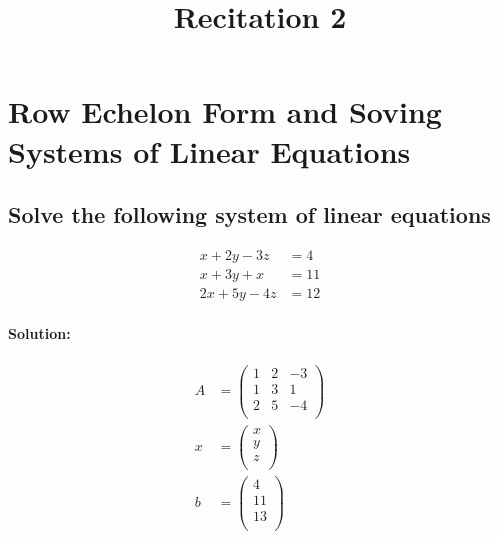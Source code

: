 \documentclass[fleqn]{article}
\title{Recitation 2}
\author{}
\date{\formatdate{5}{11}{2014}}
\begin{document}
\maketitle
\setlength{\mathindent}{0pt}

\tableofcontents

\newpage
\section{Row Echelon Form and Soving Systems of Linear Equations}

\subsection{Solve the following system of linear equations}

\begin{align*}
	x + 2y - 3z &= 4\\
	x + 3y + x &= 11\\
	2x + 5y - 4z &= 12
\end{align*}

\paragraph*{Solution:\\}

\begin{align*}
	A &= 
	\begin{pmatrix}
		1 & 2 & -3 \\
		1 & 3 & 1 \\
		2 & 5 & -4 \\
	\end{pmatrix}\\
	x &= 
	\begin{pmatrix}
		x\\
		y\\
		z\\
	\end{pmatrix}\\
	b &= 
	\begin{pmatrix}
		4\\
		11\\
		13\\
	\end{pmatrix}
\end{align*}
\end{document}
